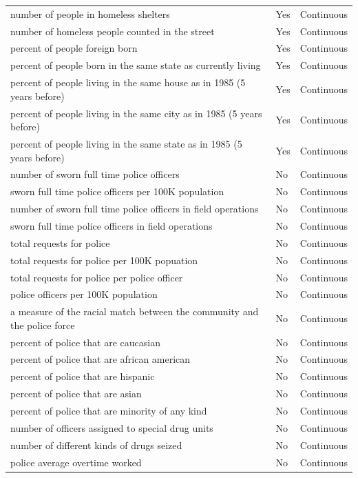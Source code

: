 \documentclass[
  11pt,
]{article}
\begin{document}
\begin{longtable}[t]{lll}
number of people in homeless shelters & Yes & Continuous\\
\addlinespace
number of homeless people counted in the street & Yes & Continuous\\
percent of people foreign born & Yes & Continuous\\
percent of people born in the same state as currently living & Yes & Continuous\\
percent of people living in the same house as in 1985 (5 years before) & Yes & Continuous\\
percent of people living in the same city as in 1985 (5 years before) & Yes & Continuous\\
\addlinespace
percent of people living in the same state as in 1985 (5 years before) & Yes & Continuous\\
number of sworn full time police officers & No & Continuous\\
sworn full time police officers per 100K population & No & Continuous\\
number of sworn full time police officers in field operations & No & Continuous\\
sworn full time police officers in field operations & No & Continuous\\
\addlinespace
total requests for police & No & Continuous\\
total requests for police per 100K popuation & No & Continuous\\
total requests for police per police officer & No & Continuous\\
police officers per 100K population & No & Continuous\\
a measure of the racial match between the community and the police force & No & Continuous\\
\addlinespace
percent of police that are caucasian & No & Continuous\\
percent of police that are african american & No & Continuous\\
percent of police that are hispanic & No & Continuous\\
percent of police that are asian & No & Continuous\\
percent of police that are minority of any kind & No & Continuous\\
\addlinespace
number of officers assigned to special drug units & No & Continuous\\
number of different kinds of drugs seized & No & Continuous\\
police average overtime worked & No & Continuous\\

\end{longtable}
\end{document}
